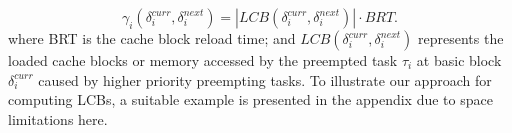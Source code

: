 \begin{equation}\label{eqn:crpd-formula}
    \gamma_{i}(\delta_{i}^{curr},\delta_{i}^{next}) = | \textit{LCB}(\delta_{i}^{curr},\delta_{i}^{next}) | \cdot BRT.
\end{equation}
\noindent
where BRT is the cache block reload time; and \begin{math}\textit{LCB}(\delta_{i}^{curr},\delta_{i}^{next})\end{math} represents the loaded cache blocks or memory accessed by the preempted task \begin{math}\tau_{i}\end{math} at basic block \begin{math}\delta_{i}^{curr}\end{math} caused by higher priority preempting tasks.
To illustrate our approach for computing LCBs, a suitable example is presented in the appendix due to space limitations here.
